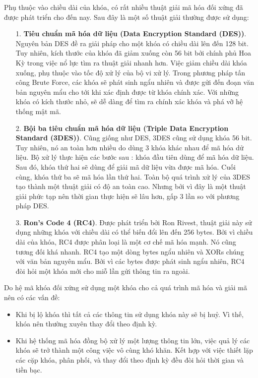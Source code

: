 \documentclass[a4paper,12pt]{report}
\begin{document}
Phụ thuộc vào chiều dài của khóa, có rất nhiều thuật giải mã hóa đối xứng đã được phát triển cho đến nay. Sau đây là một số thuật giải thường được sử dụng:
\begin{itemize}
\item[1. ] \textbf{Tiêu chuẩn mã hóa dữ liệu (Data Encryption Standard (DES))}. Nguyên bản DES  đề ra giải pháp cho một khóa có chiều dài lên đến 128 bit. Tuy nhiên, kích thước của khóa đã giảm xuống còn 56 bit bởi chính phủ Hoa Kỳ trong việc nổ lực tìm ra thuật giải nhanh hơn. Việc giảm chiều dài khóa xuống, phụ thuộc vào tốc độ xử lý của bộ vi xử lý. Trong phương pháp tấn công Brute Force, các khóa sẽ phát sinh ngẩu nhiên và được gửi đến đoạn văn bản nguyên mẩu cho tới khi xác định được từ khóa chính xác. Với những khóa có kích thước nhỏ, sẽ dễ dàng để tìm ra chính xác khóa và phá vỡ hệ thống mật mã.
\item[2. ] \textbf{Bội ba tiêu chuẩn mã hóa dữ liệu (Triple Data Encryption Standard (3DES))}. Cũng giống như DES, 3DES cũng sử dụng khóa 56 bit. Tuy nhiên, nó an toàn hơn nhiều do dùng 3 khóa khác nhau để mã hóa dử liệu. Bộ xử lý thực hiện các bước sau : khóa đầu tiên dùng để mã hóa dữ liệu. Sau đó, khóa thứ hai sẽ dùng để giải mã dữ liệu vừa được mã hóa. Cuối cùng, khóa thứ ba sẽ mã hóa lần thứ hai. Toàn bộ quá trình xử lý của 3DES tạo thành một thuật giải có độ an toàn cao. Nhưng bởi vì đây là một thuật giải phức tạp nên thời gian thực hiện sẽ lâu hơn, gấp 3 lần so với phương pháp DES.
\item[3. ] \textbf{Ron's Code 4 (RC4)}. Được phát triển bởi Ron Rivest, thuật giải này sử dụng những khóa với chiều dài có thể biến đổi lên đến 256 bytes. Bởi vì chiều dài của khóa, RC4 được phân loại là một cơ chế mã hóa mạnh. Nó cũng tương đối khá nhanh. RC4 tạo một dòng bytes ngẩu nhiên và XORs chúng với văn bản nguyên mẩu. Bởi vì các bytes được phát sinh ngẩu nhiên, RC4 đòi hỏi một khóa mới cho miỗ lần gửi thông tin ra ngoài.
\end{itemize}

Do hệ mã khóa đối xứng sử dụng một khóa cho cả quá trình mã hóa và giải mã nên có các vấn đề:
\begin{itemize}
\item Khi bị lộ khóa thì tất cả các thông tin sử dụng khóa này sẽ bị huỷ. Vì thế, khóa nên thường xuyên thay đổi theo định kỳ.
\item Khi hệ thống mã hóa đồng bộ xử lý một lượng thông tin lớn, việc quả lý các khóa sẽ trở thành một công việc vô cùng khó khăn. Kết hợp với việc thiết lặp các cặp khóa, phân phối, và thay đổi theo định kỳ đều đòi hỏi thời gian và tiền bạc.
\end{itemize}
\end{document}
